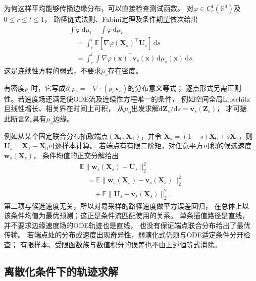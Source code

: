 为何这样平均能够传播边缘分布，可以直接检查测试函数。
对$\varphi\in C_c^1(\mathbb R^d)$及$0\leq r\leq t\leq1$，
路径链式法则、Fubini定理及条件期望依次给出
\begin{equation}
 \begin{aligned}
 &\int\varphi\,\mathrm d\mu_t-\int\varphi\,\mathrm d\mu_r\\
 &\quad=\int_r^t\mathbb E[\nabla\varphi(\bm X_s)^\top\bm U_s]\,\mathrm ds\\
 &\quad=\int_r^t\int\nabla\varphi(\bm x)^\top\bm v_s(\bm x)
                                      \,\mathrm d\mu_s(\bm x)\,\mathrm ds.
 \end{aligned}
 \label{eq:dynamical-conditional-path-continuity}
\end{equation}
这是连续性方程的弱式，不要求$\mu_s$存在密度。

有密度$p_s$时，它写成$\partial_s p_s=-\nabla\cdot(p_s\bm v_s)$的分布意义等式；
逐点形式另需正则性。若速度场还满足使ODE流及连续性方程唯一的条件，
例如空间全局Lipschitz且线性增长、相关界在时间上可积，
从$\mu_0$出发求解$\mathrm d\bm Z_s/\mathrm ds=\bm v_s(\bm Z_s)$，
才可据此断言$\bm Z_s$具有$\mu_s$边缘。

例如从某个固定联合分布抽取端点$(\bm X_0,\bm X_1)$，并令
$\bm X_s=(1-s)\bm X_0+s\bm X_1$，则$\bm U_s=\bm X_1-\bm X_0$可逐样本计算。
若端点有有限二阶矩，对任意平方可积的候选速度$\bm w_s(\bm X_s)$，
条件均值的正交分解给出
\begin{equation}
 \begin{aligned}
 &\mathbb E\|\bm w_s(\bm X_s)-\bm U_s\|_2^2\\
 &\quad=\mathbb E\|\bm w_s(\bm X_s)-\bm v_s(\bm X_s)\|_2^2\\
 &\qquad+\mathbb E\|\bm U_s-\bm v_s(\bm X_s)\|_2^2.
 \end{aligned}
 \label{eq:dynamical-conditional-velocity-regression}
\end{equation}
第二项与候选速度无关，所以对易采样的路径速度做平方误差回归，
在总体上以该条件均值为最优预测；这正是条件流匹配使用的关系。
单条插值路径是直线，并不要求边缘速度场的ODE轨迹也是直线，
也没有保证端点联合分布给出了最优传输。
若端点处的分布或速度出现奇异性，弱演化式仍须与ODE适定条件分开检查；
有限样本、受限函数族与数值积分的误差也不由上述恒等式消除。

\subsection{离散化条件下的轨迹求解}
\label{sec:dynamical-discretization-scan}

